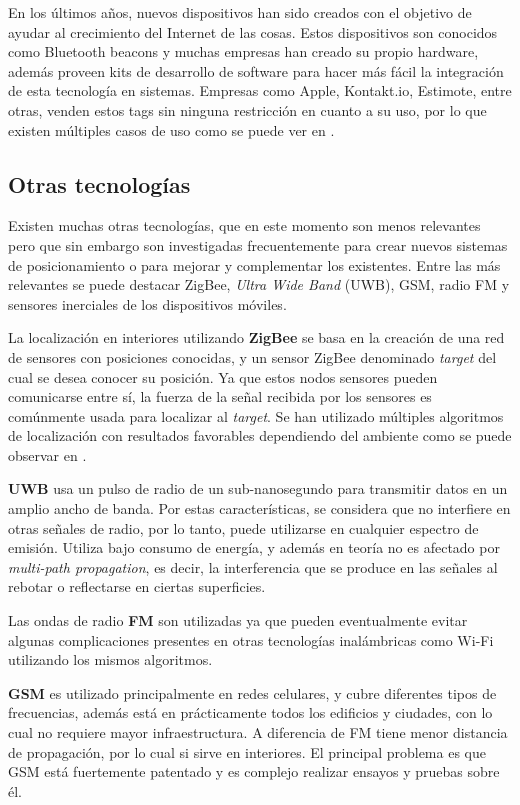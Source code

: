 En los últimos años, nuevos dispositivos han sido creados con el objetivo de ayudar al crecimiento del Internet de las cosas. Estos dispositivos son conocidos como Bluetooth beacons y muchas empresas han creado su propio hardware, además proveen kits de desarrollo de software para hacer más fácil la integración de esta tecnología en sistemas. Empresas como Apple, Kontakt.io, Estimote, entre otras, venden estos tags sin ninguna restricción en cuanto a su uso, por lo que existen múltiples casos de uso como se puede ver en \citep{kontaktio}.

\subsection{Otras tecnologías}

Existen muchas otras tecnologías, que en este momento son menos relevantes pero que sin embargo son investigadas frecuentemente para crear nuevos sistemas de posicionamiento o para mejorar y complementar los existentes. Entre las más relevantes se puede destacar ZigBee, \textit{Ultra Wide Band} (UWB), GSM, radio FM y sensores inerciales de los dispositivos móviles.

La localización en interiores utilizando \textbf{ZigBee} se basa en la creación de una red de sensores con posiciones conocidas, y un sensor ZigBee denominado \textit{target} del cual se desea conocer su posición. Ya que estos nodos sensores pueden comunicarse entre sí, la fuerza de la señal recibida por los sensores es comúnmente usada para localizar al \textit{target}. Se han utilizado múltiples algoritmos de localización con resultados favorables dependiendo del ambiente como se puede observar en \citep{6156509}.

\textbf{UWB} usa un pulso de radio de un sub-nanosegundo para transmitir datos en un amplio ancho de banda. Por estas características, se considera que no interfiere en otras señales de radio, por lo tanto, puede utilizarse en cualquier espectro de emisión.  Utiliza bajo consumo de energía, y además en teoría no es afectado por \textit{multi-path propagation}, es decir, la interferencia que se produce en las señales al rebotar o reflectarse en ciertas superficies.

Las ondas de radio \textbf{FM} son utilizadas ya que pueden eventualmente evitar algunas complicaciones presentes en otras tecnologías inalámbricas como Wi-Fi utilizando los mismos algoritmos.

\textbf{GSM} es utilizado principalmente en redes celulares, y cubre diferentes tipos de frecuencias, además está en prácticamente todos los edificios y ciudades, con lo cual no requiere mayor infraestructura. A diferencia de FM tiene menor distancia de propagación, por lo cual si sirve en interiores. El principal problema es que GSM está fuertemente patentado y es complejo realizar ensayos y pruebas sobre él.

